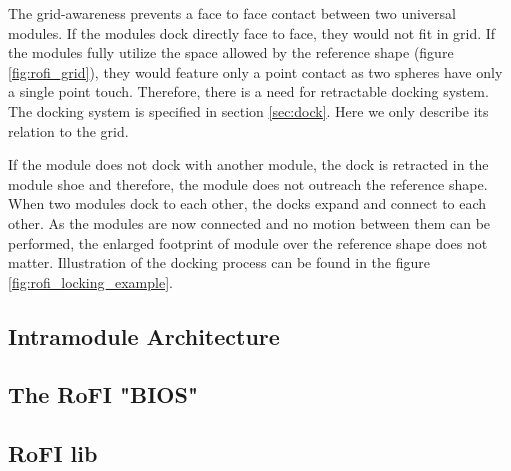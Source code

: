 The grid-awareness prevents a face to face contact between two universal
modules. If the modules dock directly face to face, they would not fit in grid.
If the modules fully utilize the space allowed by the reference shape (figure
\ref{fig:rofi_grid}), they would feature only a point contact as two spheres
have only a single point touch. Therefore, there is a need for retractable
docking system. The docking system is specified in section \ref{sec:dock}.
Here we only describe its relation to the grid.

If the module does not dock with another module, the dock is retracted in the
module shoe and therefore, the module does not outreach the reference shape.
When two modules dock to each other, the docks expand and connect to each other.
As the modules are now connected and no motion between them can be performed,
the enlarged footprint of module over the reference shape does not matter.
Illustration of the docking process can be found in the figure
\ref{fig:rofi_locking_example}.

\subsection{Intramodule Architecture}

\subsection{The RoFI "BIOS" }

\subsection{RoFI lib}

